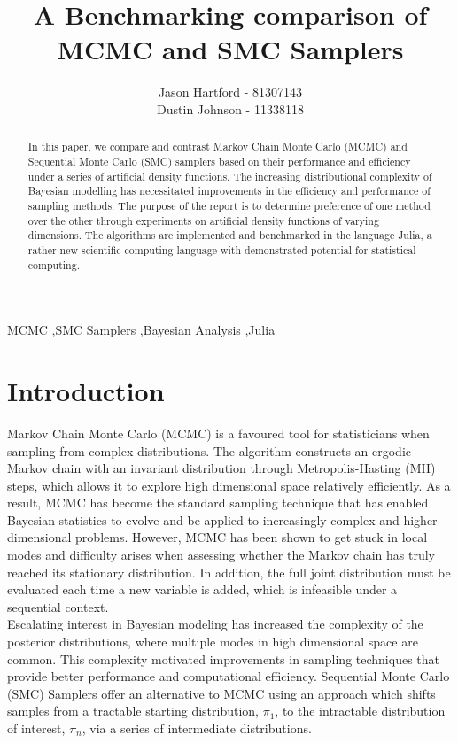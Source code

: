 \documentclass[12pt]{elsarticle}
\begin{document}
	
\begin{frontmatter}
\title{A Benchmarking comparison of MCMC and SMC Samplers}
\author{Jason Hartford - 81307143 \\ Dustin Johnson - 11338118}

\begin{abstract}
In this paper, we compare and contrast Markov Chain Monte Carlo (MCMC) and Sequential Monte Carlo (SMC) samplers based on their performance and efficiency under a series of artificial density functions. The increasing distributional complexity of Bayesian modelling has necessitated improvements in the efficiency and performance of sampling methods.  The purpose of the report is to determine preference of one method over the other through experiments on artificial density functions of varying dimensions. The algorithms are implemented and benchmarked in the language Julia, a rather new scientific computing language with demonstrated potential for statistical computing.
\end{abstract}

\begin{keyword}
MCMC \sep SMC Samplers \sep Bayesian Analysis \sep Julia
\end{keyword}

\end{frontmatter}



\section*{Introduction}
Markov Chain Monte Carlo (MCMC) is a favoured tool for statisticians when sampling from complex distributions. The algorithm constructs an ergodic Markov chain with an invariant distribution through Metropolis-Hasting (MH) steps, which allows it to explore high dimensional space relatively efficiently. As a result, MCMC has become the standard sampling technique that has enabled Bayesian statistics to evolve and be applied to increasingly complex and higher dimensional problems. However, MCMC has been shown to get stuck in local modes and difficulty arises when assessing whether the Markov chain has truly reached its stationary distribution. In addition, the full joint distribution must be evaluated each time a new variable is added, which is infeasible under a sequential context. \\

Escalating interest in Bayesian modeling has increased the complexity of the posterior distributions, where multiple modes in high dimensional space are common. This complexity motivated improvements in sampling techniques that provide better performance and computational efficiency. Sequential Monte Carlo (SMC) Samplers offer an alternative to MCMC using an approach which shifts samples from a tractable starting distribution, $\pi_1$, to the intractable distribution of interest, $\pi_n$, via a series of intermediate distributions. \\
\end{document}
